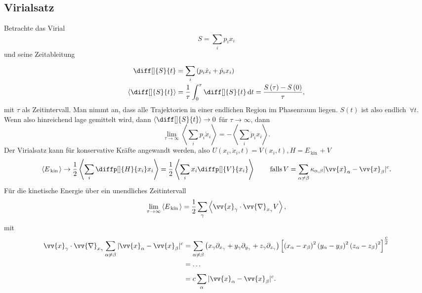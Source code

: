 \documentclass[a4paper,12pt]{article}
\newcommand{\td}{\,\text{d}}
\numberwithin{equation}{section}
\begin{document}
\subsection{Virialsatz}
Betrachte das Virial 
\[ 
        S=\sum_{i}^{}p_ix_i
\] 
und seine Zeitableitung
\begin{align*}
        \diff[]{S}{t}&=\sum_{i}^{}\left(p_i\dot{x}_i+\dot{p}_ix_i\right)\\
        \left\langle \diff[]{S}{t}\right\rangle &=\dfrac{1}{\tau }\int_{0}^{\tau }\diff[]{S}{t}\td t=\dfrac{S\left(\tau \right)-S\left(0\right)}{\tau }
,\end{align*}
mit $\tau $ als Zeitintervall. Man nimmt an, dass alle Trajektorien in einer endlichen Region im Phasenraum liegen. $S(t)$ ist also endlich $\,\forall t$. Wenn also hinreichend lage gemittelt wird, dann $\left\langle \diff[]{S}{t}\right\rangle \rightarrow 0$ für $\tau \rightarrow \infty$, dann
\[ 
        \lim_{\tau \rightarrow \infty}\left\langle \sum_{i}^{}p_i\dot{x}_i\right\rangle =-\left\langle \sum_{i}^{}\dot{p}_ix_i\right\rangle 
.\] 
Der Virialsatz kann für konservative Kräfte angewandt werden, also $U(x_i,\dot{x}_i,t)=V(x_i,t),H=E_{\,\text{kin}\,}+V$
\[ 
        \left\langle E_{\,\text{kin}\,}\right\rangle \rightarrow \dfrac{1}{2}\left\langle \sum_{i}^{}\diffp[]{H}{x_i}x_i\right\rangle =\dfrac{1}{2}\left\langle \sum_{i}^{}x_i\diffp[]{V}{x_i}\right\rangle \qquad \,\text{falls}\,V=\sum_{\alpha \neq \beta }^{}\kappa _{\alpha ,\beta }|\vv{x}_\alpha -\vv{x}_\beta |^c
.\] 
Für die kinetische Energie über ein unendliches Zeitintervall
\begin{align*}
        \lim_{\tau \rightarrow \infty}\left\langle E_{\,\text{kin}\,}\right\rangle =\dfrac{1}{2}\sum_{\gamma }^{}\left\langle \vv{x}_\gamma \cdot \vv{\nabla }_{x_\gamma }V\right\rangle
,\end{align*}
mit
\begin{align*}
        \vv{x}_\gamma \cdot \vv{\nabla }_{x_\gamma }\sum_{\alpha \neq \beta }^{}|\vv{x}_\alpha -\vv{x}_\beta |^c&=\sum_{\alpha \neq \beta }^{}\left(x_\gamma \partial _{x_\gamma }+y_\gamma \partial _{y_\gamma }+z_\gamma \partial _{z_\gamma }\right)\left[\left(x_\alpha -x_\beta \right)^2\left(y_\alpha -y_\beta \right)^2\left(z_\alpha -z_\beta \right)^2\right]^{\tfrac{c}{2}}\\
                                                                                                                &=\hdots \\
                                                                                                                &=c \sum_{\alpha }^{}|\vv{x}_\alpha -\vv{x}_\beta |^c
.\end{align*}
\end{document}
